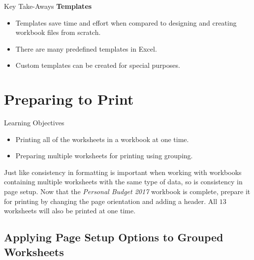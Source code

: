 \begin{center}
	\begin{tkwbox}{Key Take-Aways}
		\textbf{Templates}
		\\
		\begin{itemize}
			\setlength{\itemsep}{0pt}
			\setlength{\parskip}{0pt}
			\setlength{\parsep}{0pt}
			
			\item Templates save time and effort when compared to designing and creating workbook files from scratch.
			\item There are many predefined templates in Excel.
			\item Custom templates can be created for special purposes.
			
		\end{itemize}
	\end{tkwbox}
\end{center}

\section{Preparing to Print}

\begin{center}
	\begin{objbox}{Learning Objectives}
		\begin{itemize}
			\setlength{\itemsep}{0pt}
			\setlength{\parskip}{0pt}
			\setlength{\parsep}{0pt}
			
			\item Printing all of the worksheets in a workbook at one time.
			\item Preparing multiple worksheets for printing using grouping.
			
		\end{itemize}
	\end{objbox}
\end{center}

Just like consistency in formatting is important when working with workbooks containing multiple worksheets with the same type of data, so is consistency in page setup. Now that the \textit{Personal Budget 2017} workbook is complete, prepare it for printing by changing the page orientation and adding a header. All $ 13 $ worksheets will also be printed at one time.

\subsection{Applying Page Setup Options to Grouped Worksheets}

